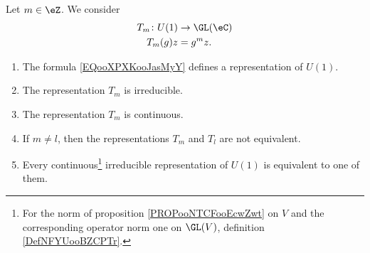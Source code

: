 \begin{proposition}       \label{PROPooLWWEooUmqbRA}
    Let \( m\in \eZ\). We consider
    \begin{equation}        \label{EQooXPXKooJasMyY}
        \begin{aligned}
            T_m\colon U(1)&\to \GL(\eC) \\
            T_m(g)z&=g^mz.
        \end{aligned}
    \end{equation}
    \begin{enumerate}
        \item
            The formula \eqref{EQooXPXKooJasMyY} defines a representation of \( U(1)\).
        \item
            The representation \( T_m\) is irreducible.
        \item
            The representation \( T_m\) is continuous.
        \item
            If \( m\neq l\), then the representations \( T_m\) and \( T_l\) are not equivalent.
        \item       \label{ITEMooUPVQooQddQOJ}
            Every continuous\footnote{For the norm of proposition \ref{PROPooNTCFooEcwZwt} on \( V\) and the corresponding operator norm one on \( \GL(V)\), definition \ref{DefNFYUooBZCPTr}.} irreducible representation of \( U(1)\) is equivalent to one of them.
    \end{enumerate}
\end{proposition}

